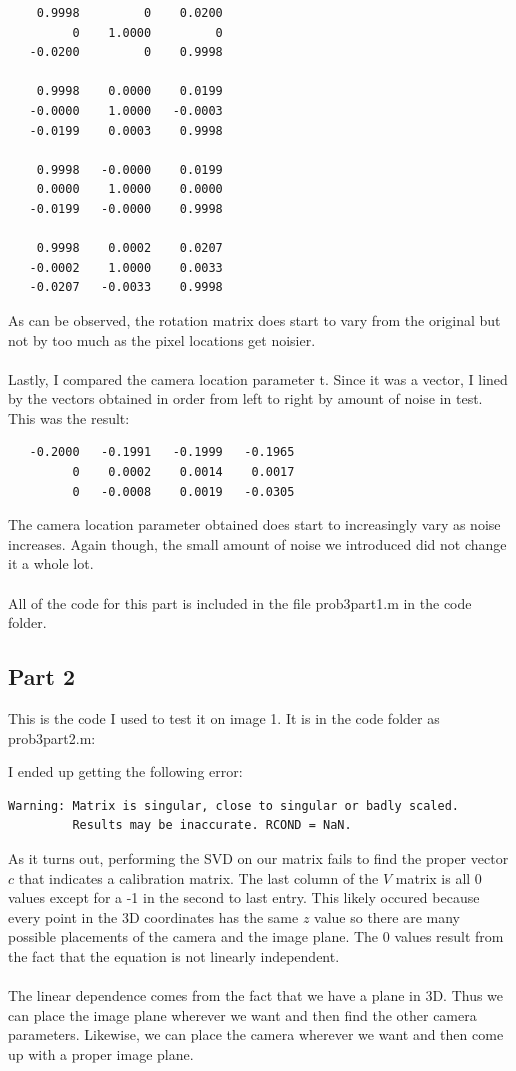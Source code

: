 \documentclass[11pt,psfig]{article}
\begin{document}
\begin{verbatim}
    0.9998         0    0.0200
         0    1.0000         0
   -0.0200         0    0.9998

    0.9998    0.0000    0.0199
   -0.0000    1.0000   -0.0003
   -0.0199    0.0003    0.9998

    0.9998   -0.0000    0.0199
    0.0000    1.0000    0.0000
   -0.0199   -0.0000    0.9998

    0.9998    0.0002    0.0207
   -0.0002    1.0000    0.0033
   -0.0207   -0.0033    0.9998
\end{verbatim}
As can be observed, the rotation matrix does start to vary from the original but not by too much as the pixel locations get noisier. \\
\\
Lastly, I compared the camera location parameter t. Since it was a vector, I lined by the vectors obtained in order from left to right by amount of noise in test. This was the result:

\begin{verbatim}
   -0.2000   -0.1991   -0.1999   -0.1965
         0    0.0002    0.0014    0.0017
         0   -0.0008    0.0019   -0.0305
\end{verbatim} 

The camera location parameter obtained does start to increasingly vary as noise increases. Again though, the small amount of noise we introduced did not change it a whole lot. \\
\\
All of the code for this part is included in the file prob3part1.m in the code folder. 

\newpage

\subsection*{Part 2}

This is the code I used to test it on image 1. It is in the code folder as prob3part2.m:

I ended up getting the following error:
\begin{verbatim}
Warning: Matrix is singular, close to singular or badly scaled.
         Results may be inaccurate. RCOND = NaN. 
\end{verbatim}
As it turns out, performing the SVD on our matrix fails to find the proper vector $c$ that indicates a calibration matrix. The last column of the $V$ matrix is all 0 values except for a -1 in the second to last entry. This likely occured because every point in the 3D coordinates has the same $z$ value so there are many possible placements of the camera and the image plane. The 0 values result from the fact that the equation is not linearly independent. \\
\\
The linear dependence comes from the fact that we have a plane in 3D. Thus we can place the image plane wherever we want and then find the other camera parameters. Likewise, we can place the camera wherever we want and then come up with a proper image plane. 
\end{document}

